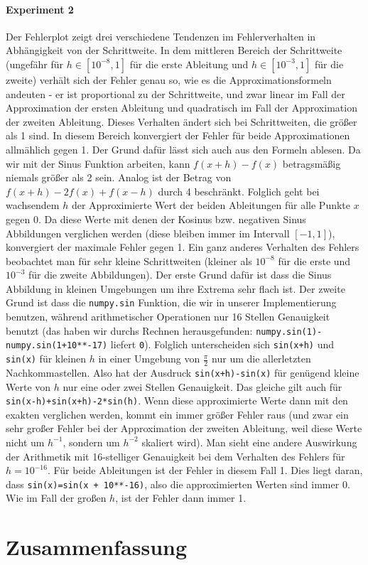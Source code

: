 \documentclass[smallheadings]{scrartcl}
\begin{document}
\paragraph{Experiment 2}
Der Fehlerplot zeigt drei verschiedene Tendenzen im Fehlerverhalten in Abhängigkeit von der Schrittweite. In dem mittleren Bereich der Schrittweite (ungefähr für $h\in\left[10^{-8}, 1\right]$ für die erste Ableitung und $h\in[10^{-3}, 1] $ für die zweite) verhält sich der Fehler genau so, wie es die Approximationsformeln andeuten - er ist proportional zu der Schrittweite, und zwar linear im Fall der Approximation der ersten Ableitung und quadratisch im Fall der Approximation der zweiten Ableitung. \newline
Dieses Verhalten ändert sich bei Schrittweiten, die größer als 1 sind. In diesem Bereich konvergiert der Fehler für beide Approximationen allmählich gegen 1. Der Grund dafür lässt sich auch aus den Formeln ablesen. Da wir mit der Sinus Funktion arbeiten, kann $f(x+h)-f(x)$ betragsmäßig niemals größer als 2 sein. Analog ist der Betrag von $f(x+h)-2f(x)+f(x-h)$ durch 4 beschränkt. Folglich geht bei wachsendem $h$ der Approximierte Wert der beiden Ableitungen für alle Punkte $x$ gegen 0. Da diese Werte mit denen der Kosinus bzw. negativen Sinus Abbildungen verglichen werden (diese bleiben immer im Intervall $[-1, 1]$), konvergiert der maximale Fehler gegen 1. \newline
Ein ganz anderes Verhalten des Fehlers beobachtet man für sehr kleine Schrittweiten (kleiner als $10^{-8} $ für die erste und $10^{-3}$ für die zweite Abbildungen). Der erste Grund dafür ist dass die Sinus Abbildung in kleinen Umgebungen um ihre Extrema sehr flach ist. Der zweite Grund ist dass die \texttt{numpy.sin} Funktion, die wir in unserer Implementierung benutzen, während arithmetischer Operationen nur 16 Stellen Genauigkeit benutzt (das haben wir durchs Rechnen herausgefunden: \texttt{numpy.sin(1)-numpy.sin(1+10**-17)}  liefert \texttt{0}). Folglich unterscheiden sich \texttt{sin(x+h)} und \texttt{sin(x)} für kleinen $h$ in einer Umgebung von $\frac{\pi}{2}$ nur um die allerletzten Nachkommastellen. Also hat der Ausdruck \texttt{sin(x+h)-sin(x)} für genügend kleine Werte von $h$ nur eine oder zwei Stellen Genauigkeit. Das gleiche gilt auch für \texttt{sin(x-h)+sin(x+h)-2*sin(h)}. Wenn diese approximierte Werte dann mit den exakten verglichen werden, kommt ein immer größer Fehler raus (und zwar ein sehr großer Fehler bei der Approximation der zweiten Ableitung, weil diese Werte nicht um $h^{-1}$, sondern um $h^{-2}$ skaliert wird). Man sieht eine andere Auswirkung der Arithmetik mit 16-stelliger Genauigkeit bei dem Verhalten des Fehlers für $h=10^{-16}$. Für beide Ableitungen ist der Fehler in diesem Fall 1. Dies liegt daran, dass \texttt{sin(x)=sin(x + 10**-16)}, also die approximierten Werten sind immer 0. Wie im Fall der großen $h$, ist der Fehler dann immer 1.

\section{Zusammenfassung}

\end{document}
